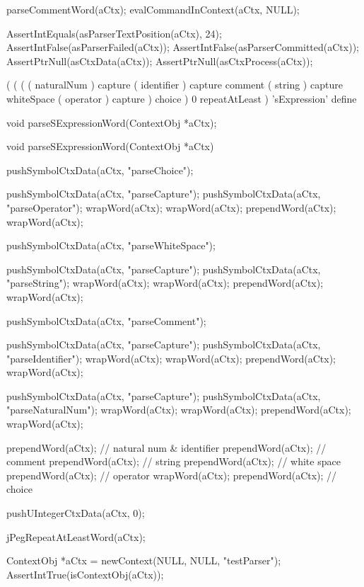   parseCommentWord(aCtx);
  evalCommandInContext(aCtx, NULL);
  
  AssertIntEquals(asParserTextPosition(aCtx), 24);
  AssertIntFalse(asParserFailed(aCtx));
  AssertIntFalse(asParserCommitted(aCtx));
  AssertPtrNull(asCtxData(aCtx));
  AssertPtrNull(asCtxProcess(aCtx));
\stopCTest
\stopTestCase
\stopTestSuite

\startTestSuite[parseSExpressionWord]

\starttyping
(
  (
    (
      ( naturalNum ) capture
      ( identifier ) capture
      comment
      ( string     ) capture
      whiteSpace
      ( operator   ) capture
    ) choice
  ) 0 repeatAtLeast
) 'sExpression' define
\stoptyping

\startCHeader
void parseSExpressionWord(ContextObj *aCtx);
\stopCHeader

\startCCode
void parseSExpressionWord(ContextObj *aCtx) {

  pushSymbolCtxData(aCtx, "parseChoice");
  
  pushSymbolCtxData(aCtx, "parseCapture");
  pushSymbolCtxData(aCtx, "parseOperator");
  wrapWord(aCtx);
  wrapWord(aCtx);
  prependWord(aCtx);
  wrapWord(aCtx);
  
  pushSymbolCtxData(aCtx, "parseWhiteSpace");
  
  pushSymbolCtxData(aCtx, "parseCapture");
  pushSymbolCtxData(aCtx, "parseString");
  wrapWord(aCtx);
  wrapWord(aCtx);
  prependWord(aCtx);
  wrapWord(aCtx);
  
  pushSymbolCtxData(aCtx, "parseComment");
  
  pushSymbolCtxData(aCtx, "parseCapture");
  pushSymbolCtxData(aCtx, "parseIdentifier");
  wrapWord(aCtx);
  wrapWord(aCtx);
  prependWord(aCtx);
  wrapWord(aCtx);

  pushSymbolCtxData(aCtx, "parseCapture");
  pushSymbolCtxData(aCtx, "parseNaturalNum");
  wrapWord(aCtx);
  wrapWord(aCtx);
  prependWord(aCtx);
  wrapWord(aCtx);
  
  prependWord(aCtx); // natural num & identifier
  prependWord(aCtx); // comment
  prependWord(aCtx); // string
  prependWord(aCtx); // white space
  prependWord(aCtx); // operator
  wrapWord(aCtx);
  prependWord(aCtx); // choice

  pushUIntegerCtxData(aCtx, 0);

  jPegRepeatAtLeastWord(aCtx);
}
\stopCCode

\startCTest
  ContextObj *aCtx = newContext(NULL, NULL, "testParser");
  AssertIntTrue(isContextObj(aCtx));
  
